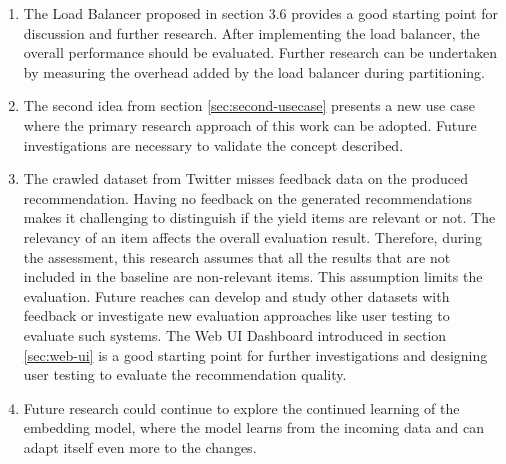 \begin{enumerate}
    \item The Load Balancer proposed in section 3.6 provides a good starting point for discussion and further research. After implementing the load balancer, the overall performance should be evaluated. Further research can be undertaken by measuring the overhead added by the load balancer during partitioning.
    
    \item The second idea from section \ref{sec:second-usecase} presents a new use case where the primary research approach of this work can be adopted. Future investigations are necessary to validate the concept described.
    
    \item The crawled dataset from Twitter misses feedback data on the produced recommendation. Having no feedback on the generated recommendations makes it challenging to distinguish if the yield items are relevant or not. The relevancy of an item affects the overall evaluation result. Therefore, during the assessment, this research assumes that all the results that are not included in the baseline are non-relevant items. This assumption limits the evaluation. Future reaches can develop and study other datasets with feedback or investigate new evaluation approaches like user testing to evaluate such systems. The Web UI Dashboard introduced in section \ref{sec:web-ui} is a good starting point for further investigations and designing user testing to evaluate the recommendation quality.
    
    \item Future research could continue to explore the continued learning of the embedding model, where the model learns from the incoming data and can adapt itself even more to the changes. 
\end{enumerate}
